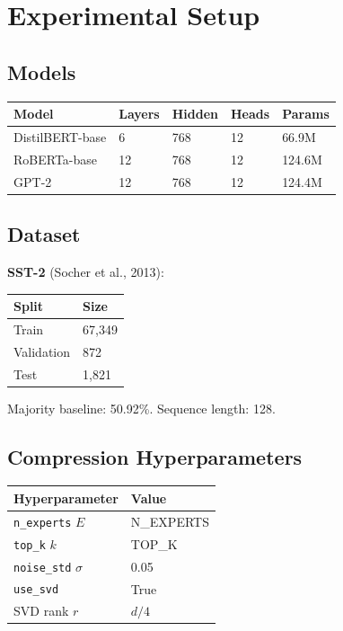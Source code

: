 \section{Experimental Setup}

\subsection{Models}

\begin{table}[H]
\centering
\small
\begin{tabular}{lllll}
\toprule
\textbf{Model} & \textbf{Layers} & \textbf{Hidden} & \textbf{Heads} & \textbf{Params} \\
\midrule
DistilBERT-base & 6 & 768 & 12 & 66.9M \\
RoBERTa-base & 12 & 768 & 12 & 124.6M \\
GPT-2 & 12 & 768 & 12 & 124.4M \\
\bottomrule
\end{tabular}
\end{table}

\subsection{Dataset}

\textbf{SST-2} (Socher et al., 2013):

\begin{table}[H]
\centering
\small
\begin{tabular}{ll}
\toprule
\textbf{Split} & \textbf{Size} \\
\midrule
Train & 67,349 \\
Validation & 872 \\
Test & 1,821 \\
\bottomrule
\end{tabular}
\end{table}

Majority baseline: 50.92\%. Sequence length: 128.

\subsection{Compression Hyperparameters}

\begin{table}[H]
\centering
\small
\begin{tabular}{ll}
\toprule
\textbf{Hyperparameter} & \textbf{Value} \\
\midrule
\texttt{n\_experts} $E$ & {{N\_EXPERTS}} \\
\texttt{top\_k} $k$ & {{TOP\_K}} \\
\texttt{noise\_std} $\sigma$ & 0.05 \\
\texttt{use\_svd} & True \\
SVD rank $r$ & $d/4$ \\
\bottomrule
\end{tabular}
\end{table}


